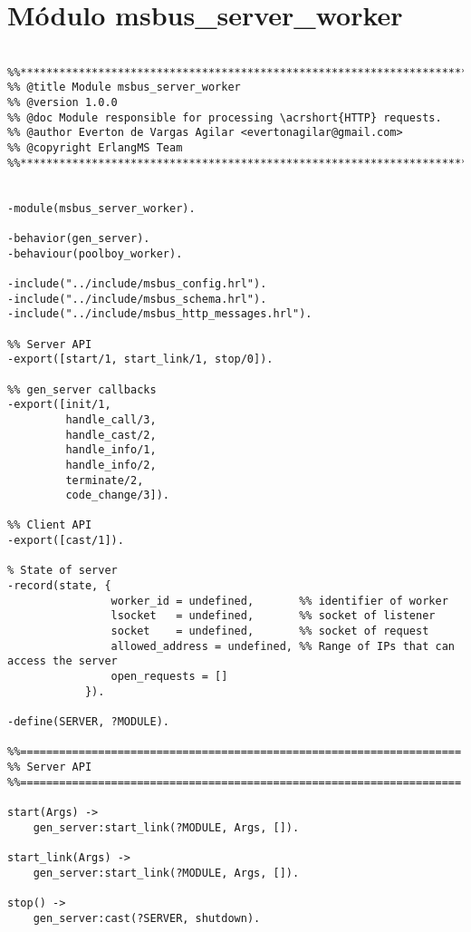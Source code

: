 \section{Módulo msbus\_server\_worker}



             
\begin{lstlisting} 

%%****************************************************************************
%% @title Module msbus_server_worker
%% @version 1.0.0
%% @doc Module responsible for processing \acrshort{HTTP} requests.
%% @author Everton de Vargas Agilar <evertonagilar@gmail.com>
%% @copyright ErlangMS Team
%%****************************************************************************


-module(msbus_server_worker).

-behavior(gen_server). 
-behaviour(poolboy_worker).

-include("../include/msbus_config.hrl").
-include("../include/msbus_schema.hrl").
-include("../include/msbus_http_messages.hrl").

%% Server API
-export([start/1, start_link/1, stop/0]).

%% gen_server callbacks
-export([init/1, 
		 handle_call/3, 
		 handle_cast/2, 
		 handle_info/1, 
		 handle_info/2, 
		 terminate/2, 
		 code_change/3]).

%% Client API
-export([cast/1]).

% State of server
-record(state, {
				worker_id = undefined,  	 %% identifier of worker
				lsocket   = undefined,		 %% socket of listener
				socket	  = undefined,		 %% socket of request
				allowed_address = undefined, %% Range of IPs that can access the server
				open_requests = []
			}).

-define(SERVER, ?MODULE).

%%====================================================================
%% Server API
%%====================================================================

start(Args) -> 
    gen_server:start_link(?MODULE, Args, []).
    
start_link(Args) ->
    gen_server:start_link(?MODULE, Args, []).
    
stop() ->
    gen_server:cast(?SERVER, shutdown).
 


\end{lstlisting}

